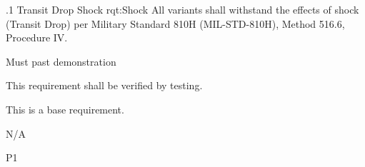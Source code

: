 

\ONERQMTVKSA
{\RqtNumberBase.1}
{Transit Drop Shock}
{rqt:Shock}
{All \ThisSystem variants shall withstand the effects of shock (Transit Drop) per Military Standard 810H (MIL-STD-810H), Method 516.6, Procedure IV.}
{
	\item [Phase 1] Must past demonstration
}
{This requirement shall be verified by testing.}
{
\item [N/A] This is a base requirement.
}
{
	\item N/A
}
{P1}
